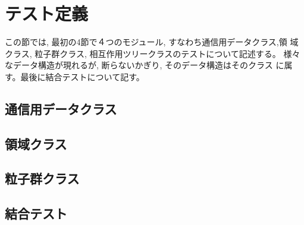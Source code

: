 \section{テスト定義}
\label{sec:test}

この節では, 最初の4節で４つのモジュール, すなわち通信用データクラス,領
域クラス, 粒子群クラス, 相互作用ツリークラスのテストについて記述する。
様々なデータ構造が現れるが, 断らないかぎり, そのデータ構造はそのクラス
に属す。最後に結合テストについて記す。


\subsection{通信用データクラス}

\subsection{領域クラス}

\subsection{粒子群クラス}






\subsection{結合テスト}


